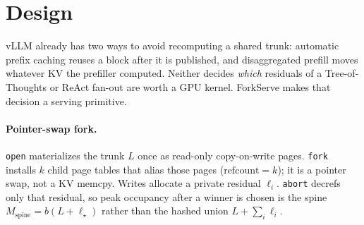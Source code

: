 \documentclass[11pt,a4paper]{article}
\begin{document}
\begin{abstract}
Control-plane APP (setting L) is the only method that both aliases the trunk and drops low-score residuals: modeled fan-out $35.9$\,ms vs.\ $139$\,ms for APC, peak KV $2880$ vs.\ $11520$.
A GPU run of the same stack on Qwen3-8B (setting M: $80$ items, $D{=}512$) confirms the KV gap and the decode-stop gain.
On GSM8K, ForkServe+ emits $13356$ decode tokens vs.\ $40960$ for APC at $\mathrm{tp}{=}2$ ($0.33\times$) and finishes in $28.2$\,s vs.\ $36.0$\,s; at $\mathrm{tp}{=}4$ it is $12826$ vs.\ $40960$ tokens and $16.9$\,s vs.\ $22.7$\,s, with accuracy $0.925$ vs.\ $0.938$.
Peak KV stays $1182$ vs.\ $1582$ ($0.75\times$ APC) at both widths.
Setting N repeats the same four-system forest on six models ($n{=}40$): GSM8K peak KV is $0.72$--$0.75\times$ APC on every family, and Game24 is $0.57$--$0.62\times$.
A last-line answer stop on DeepSeek-R1, Llama-3-8B, and Mistral-7B ($n{=}32$, $\mathrm{tp}{=}2$) keeps GSM8K peak at $0.73\times$ APC.
ForkServe+ scores $18/32$ (APC $16/32$) on DeepSeek-R1 and $22/32$ (APC $23/32$) on Llama-3-8B, and drops to $6/32$ (APC $11/32$) on Mistral-7B.
A $k$ sweep on the same three models ($n{=}16$) leaves the spine flat while APC grows: the ratio moves from $0.89$--$0.90$ at $k{=}2$ to $0.53$--$0.55$ at $k{=}8$.
On MATH-500 ($n{=}200$, $D{=}2048$) DeepSeek-R1 peak is $0.75\times$ APC and Qwen3-4B peak is $0.79\times$.
ForkServe+ keeps that peak and brings MATH-500 fan-out to the APC level ($1553$ vs.\ $1604$\,ms on DeepSeek-R1, $1223$ vs.\ $1178$\,ms on Qwen3-4B).
\end{abstract}

\section{Design}
\label{sec:design}

vLLM already has two ways to avoid recomputing a shared trunk: automatic prefix caching reuses a block after it is published, and disaggregated prefill moves whatever KV the prefiller computed.
Neither decides \emph{which} residuals of a Tree-of-Thoughts or ReAct fan-out are worth a GPU kernel.
ForkServe makes that decision a serving primitive.

\paragraph{Pointer-swap fork.}
\texttt{open} materializes the trunk $L$ once as read-only copy-on-write pages.
\texttt{fork} installs $k$ child page tables that alias those pages ($\mathrm{refcount}{=}k$); it is a pointer swap, not a KV memcpy.
Writes allocate a private residual $\ell_i$.
\texttt{abort} decrefs only that residual, so peak occupancy after a winner is chosen is the spine $M_{\mathrm{spine}}=b(L+\ell_{\star})$ rather than the hashed union $L+\sum_i\ell_i$.
\end{document}
